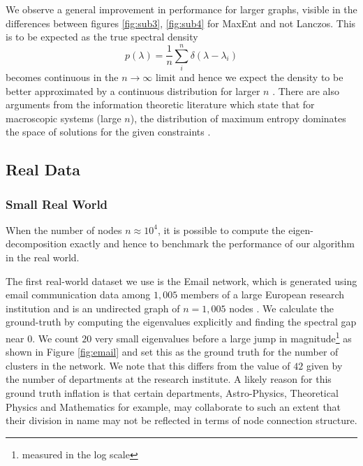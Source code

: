 \documentclass{article}
\begin{document}
We observe a general improvement in performance for larger graphs, visible in the differences between figures \ref{fig:sub3}, \ref{fig:sub4} for MaxEnt and not Lanczos. This is to be expected as the true spectral density
\begin{equation}
p(\lambda) = \frac{1}{n}\sum_{i}^{n}\delta(\lambda-\lambda_{i})
\end{equation}
becomes continuous in the $n\rightarrow\infty$ limit and hence we expect the density to be better approximated by a continuous distribution for larger $n$ \citep{ete}. There are also arguments from the information theoretic literature which state that for macroscopic systems (large $n$), the distribution of maximum entropy dominates the space of solutions for the given constraints \citep{fluctuationpriors}. 

\subsection{Real Data}

\subsubsection{Small Real World}
When the number of nodes $n \approx 10^{4}$, it is possible to compute the eigen-decomposition exactly and hence to benchmark the performance of our algorithm in the real world. 

The first real-world dataset we use is the Email network, which is generated using email communication data among $1,005$ members of a large European research institution and is an undirected graph of $n=1,005$ nodes \citep{leskovec2007graph}. We calculate the ground-truth by computing the eigenvalues explicitly and finding the spectral gap near $0$. We count $20$ very small eigenvalues before a large jump in magnitude\footnote{measured in the log scale} as shown in Figure \ref{fig:email} and set this as the ground truth for the number of clusters in the network. We note that this differs from the value of $42$ given by the number of departments at the research institute. A likely reason for this ground truth inflation is that certain departments, Astro-Physics, Theoretical Physics and Mathematics for example, may collaborate to such an extent that their division in name may not be reflected in terms of node connection structure.
\end{document}
